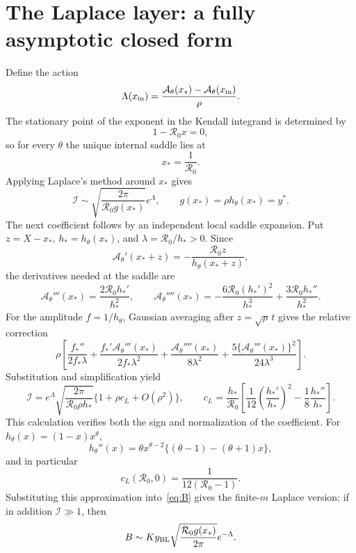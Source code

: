 \documentclass[11pt,a4paper]{article}
\newcommand{\Rzero}{\mathcal R_0}
\newcommand{\Afun}{\mathcal A_\theta}
\newcommand{\BL}{y_{\rm BL}}
\newcommand{\xin}{x_{\rm in}}
\newcommand{\xs}{x_*}
\begin{document}
\section{The Laplace layer: a fully asymptotic closed form}
Define the action
\begin{equation}
\label{eq:Lambda}
\Lambda(\xin)
=\frac{\Afun(\xs)-\Afun(\xin)}{\rho}.
\end{equation}
The stationary point of the exponent in the Kendall integrand is determined by
\[
1-\Rzero x=0,
\]
so for every $\theta$ the unique internal saddle lies at
\[
\xs=\frac1{\Rzero}.
\]
Applying Laplace's method around $\xs$ gives
\begin{equation}
\label{eq:Ilap}
\mathcal I
\sim
\sqrt{\frac{2\pi}{\Rzero g(\xs)}}e^\Lambda,
\qquad
g(\xs)=\rho h_\theta(\xs)=y^*.
\end{equation}
The next coefficient follows by an independent local saddle expansion.  Put
$z=X-\xs$, $h_*=h_\theta(\xs)$, and
$\lambda=\Rzero/h_*>0$.  Since
\[
 \Afun'(\xs+z)=-\frac{\Rzero z}{h_\theta(\xs+z)},
\]
the derivatives needed at the saddle are
\[
 \Afun'''(\xs)=\frac{2\Rzero h_*'}{h_*^2},\qquad
 \Afun''''(\xs)=-\frac{6\Rzero(h_*')^2}{h_*^3}
                  +\frac{3\Rzero h_*''}{h_*^2}.
\]
For the amplitude $f=1/h_\theta$, Gaussian averaging after
$z=\sqrt{\rho}\,t$ gives the relative correction
\begin{equation}
 \rho\left[
 \frac{f_*''}{2f_*\lambda}
 +\frac{f_*'\Afun'''(\xs)}{2f_*\lambda^2}
 +\frac{\Afun''''(\xs)}{8\lambda^2}
 +\frac{5\{\Afun'''(\xs)\}^2}{24\lambda^3}
 \right].
 \label{eq:Laplace-general-correction}
\end{equation}
Substitution and simplification yield
\begin{equation}
 \mathcal I=e^\Lambda\sqrt{\frac{2\pi}{\Rzero\rho h_*}}
 \{1+\rho c_L+O(\rho^2)\},\qquad
 c_L=\frac{h_*}{\Rzero}\left[
 \frac1{12}\left(\frac{h_*'}{h_*}\right)^2
 -\frac18\frac{h_*''}{h_*}\right].
 \label{eq:Ilap-next}
\end{equation}
This calculation verifies both the sign and normalization of the coefficient.
For $h_\theta(x)=(1-x)x^\theta$,
\[
 h_\theta''(x)=\theta x^{\theta-2}\{(\theta-1)-(\theta+1)x\},
\]
and in particular
\begin{equation}
 c_L(\Rzero,0)=\frac1{12(\Rzero-1)}.
 \label{eq:cL-theta0}
\end{equation}
Substituting this approximation into~\eqref{eq:B} gives the finite-$m$ Laplace version; if in addition $\mathcal I\gg1$, then
\begin{equation}
\label{eq:Blap}
B
\sim
K\BL
\sqrt{\frac{\Rzero g(\xs)}{2\pi}}
e^{-\Lambda}.
\end{equation}
\end{document}
